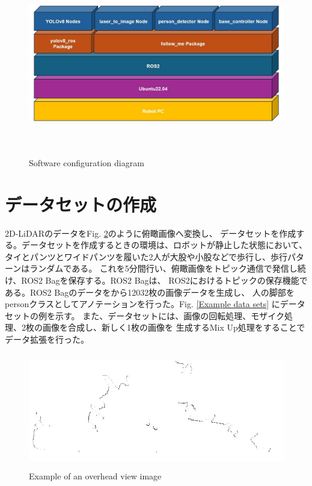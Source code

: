 \begin{figure}[h]
    \begin{center}
    \includegraphics[height=80mm,clip]{figure/Software.jpg}
    \caption{Software configuration diagram}
    \label{Software configuration diagram}
    \end{center}
\end{figure}

\clearpage

\section{データセットの作成}
2D-LiDARのデータをFig. \ref{Example of an overhead view image}のように俯瞰画像へ変換し、
データセットを作成する。データセットを作成するときの環境は、ロボットが静止した状態において、
タイとパンツとワイドパンツを履いた2人が大股や小股などで歩行し、歩行パターンはランダムである。
これを5分間行い、俯瞰画像をトピック通信で発信し続け、ROS2 Bagを保存する。ROS2 Bagは、
ROS2におけるトピックの保存機能である。ROS2 Bagのデータをから12032枚の画像データを生成し、
人の脚部をpersonクラスとしてアノテーションを行った。Fig. \ref{Example data sets}
にデータセットの例を示す。
また、データセットには、画像の回転処理、モザイク処理、2枚の画像を合成し、新しく1枚の画像を
生成するMix Up処理をすることでデータ拡張を行った。

\begin{figure}[h]
    \begin{center}
    \includegraphics[height=50mm,clip]{figure/laser_img_232.jpg}
    \caption{Example of an overhead view image}
    \label{Example of an overhead view image}
    \end{center}
\end{figure}

